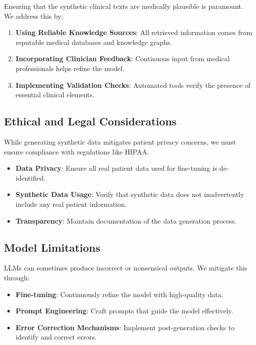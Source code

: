 \documentclass[12pt, a4paper]{article}
\begin{document}
Ensuring that the synthetic clinical texts are medically plausible is paramount. We address this by:

\begin{enumerate}
    \item \textbf{Using Reliable Knowledge Sources}: All retrieved information comes from reputable medical databases and knowledge graphs.
    \item \textbf{Incorporating Clinician Feedback}: Continuous input from medical professionals helps refine the model.
    \item \textbf{Implementing Validation Checks}: Automated tools verify the presence of essential clinical elements.
\end{enumerate}

\subsection{Ethical and Legal Considerations}

While generating synthetic data mitigates patient privacy concerns, we must ensure compliance with regulations like HIPAA.

\begin{itemize}
    \item \textbf{Data Privacy}: Ensure all real patient data used for fine-tuning is de-identified.
    \item \textbf{Synthetic Data Usage}: Verify that synthetic data does not inadvertently include any real patient information.
    \item \textbf{Transparency}: Maintain documentation of the data generation process.
\end{itemize}

\subsection{Model Limitations}

LLMs can sometimes produce incorrect or nonsensical outputs. We mitigate this through:

\begin{itemize}
    \item \textbf{Fine-tuning}: Continuously refine the model with high-quality data.
    \item \textbf{Prompt Engineering}: Craft prompts that guide the model effectively.
    \item \textbf{Error Correction Mechanisms}: Implement post-generation checks to identify and correct errors.
\end{itemize}
\end{document}
